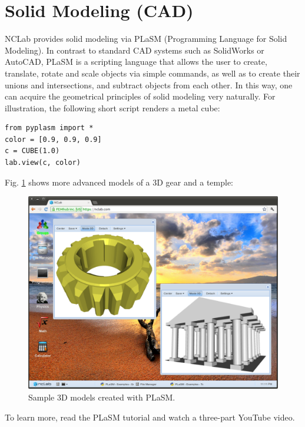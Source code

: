 \documentclass[article,A4,12pt]{llncs}
\begin{document}
\section{Solid Modeling (CAD)}

NCLab provides solid modeling via PLaSM (Programming Language for Solid Modeling). In contrast to standard
CAD systems such as SolidWorks or AutoCAD, PLaSM is a scripting language that 
allows the user to create, translate, rotate and scale objects via simple commands, 
as well as to create their unions and intersections, and subtract objects from each other.  
In this way, one can acquire the geometrical principles of solid modeling very naturally.
For illustration, the following short script renders a metal cube:
\newpage
\begin{verbatim}
from pyplasm import *
color = [0.9, 0.9, 0.9]
c = CUBE(1.0)
lab.view(c, color)
\end{verbatim}
Fig. \ref{fig:plasm1} shows more advanced models of a 3D gear and 
a temple:

\begin{figure}[!ht]
\begin{center}
\includegraphics[width=\textwidth]{img/plasm1.png}
\end{center}
\caption{Sample 3D models created with PLaSM.}
\label{fig:plasm1}
\end{figure}
\noindent
To learn more, read the PLaSM tutorial and watch a three-part YouTube video.
\end{document}
